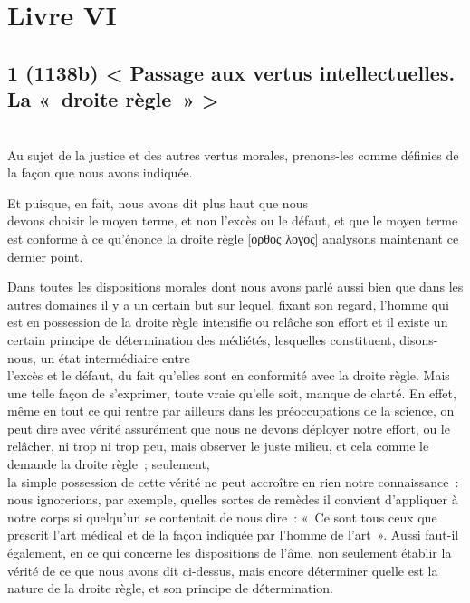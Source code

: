 \documentclass[french,twoside]{book} %
\begin{document}
\section[{Livre VI}]{Livre VI}\renewcommand{\leftmark}{Livre VI}

\subsection[{1 (1138b) < Passage aux vertus intellectuelles. La « droite règle » >}]{1 (1138b) < Passage aux vertus intellectuelles. La « droite règle » >}
\noindent \\
Au sujet de la justice et des autres vertus morales, prenons-les comme définies de la façon que nous avons indiquée.\par
Et puisque, en fait, nous avons dit plus haut que nous \\
devons choisir le moyen terme, et non l’excès ou le défaut, et que le moyen terme est conforme à ce qu’énonce la droite règle [ορθος λογος] analysons maintenant ce dernier point.\par
Dans toutes les dispositions morales dont nous avons parlé aussi bien que dans les autres domaines il y a un certain but sur lequel, fixant son regard, l’homme qui est en possession de la droite règle intensifie ou relâche son effort et il existe un certain principe de détermination des médiétés, lesquelles constituent, disons-nous, un état intermédiaire entre \\
l’excès et le défaut, du fait qu’elles sont en conformité avec la droite règle. Mais une telle façon de s’exprimer, toute vraie qu’elle soit, manque de clarté. En effet, même en tout ce qui rentre par ailleurs dans les préoccupations de la science, on peut dire avec vérité assurément que nous ne devons déployer notre effort, ou le relâcher, ni trop ni trop peu, mais observer le juste milieu, et cela comme le demande la droite règle ; seulement, \\
la simple possession de cette vérité ne peut accroître en rien notre connaissance : nous ignorerions, par exemple, quelles sortes de remèdes il convient d’appliquer à notre corps si quelqu’un se contentait de nous dire : « Ce sont tous ceux que prescrit l’art médical et de la façon indiquée par l’homme de l’art ». Aussi faut-il également, en ce qui concerne les dispositions de l’âme, non seulement établir la vérité de ce que nous avons dit ci-dessus, mais encore déterminer quelle est la nature de la droite règle, et son principe de détermination.
\end{document}
